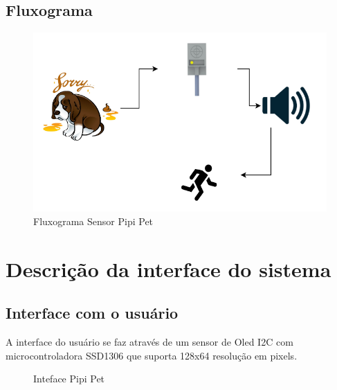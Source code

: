\documentclass[12pt,a4paper]{article}
\let\oldsection\section
\renewcommand\section{\clearpage\oldsection}
\begin{document}
\subsection{Fluxograma}
\begin{figure}[htb!]
	\centering
	\includegraphics[width=13cm]{fluxograma}
	\caption{Fluxograma Sensor Pipi Pet}
	\label{fig:fluxograma}
\end{figure}

\section{Descrição da interface do sistema}

\subsection{Interface com o usuário}
A interface do usuário se faz através de um sensor de Oled I2C com
\gls{microcontroladora} SSD1306 que suporta 128x64 resolução em pixels.
\begin{figure}[htb!]
	\centering
	\qquad
	\caption{Inteface Pipi Pet}
	\label{fig:interface}
\end{figure}
\end{document}
